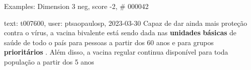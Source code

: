 \begin{frame}{Examples: Dimension 3 neg, score -2, \# 000042}
\footnotesize
\begin{alertblock}{text: t007600, user: ptsaopaulosp, 2023-03-30}
Capaz de dar ainda mais proteção contra o vírus, a vacina bivalente está sendo 
dada nas \textbf{unidades} \textbf{básicas} de saúde de todo o país para 
pessoas a partir dos 60 anos e para grupos \textbf{prioritários} . Além disso, 
a vacina regular continua disponível para toda população a partir dos 5 anos 
\end{alertblock}
\end{frame}
